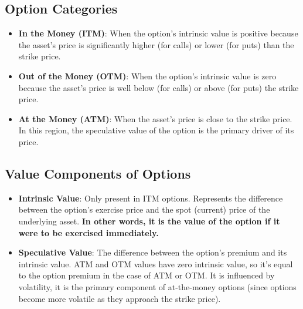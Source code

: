 \subsection*{Option Categories}

\begin{itemize}
    \item \textbf{In the Money (ITM)}: When the option's intrinsic value is positive because the asset's price is significantly higher (for calls) or lower (for puts) than the strike price. 
    \item \textbf{Out of the Money (OTM)}: When the option's intrinsic value is zero because the asset's price is well below (for calls) or above (for puts) the strike price.
    \item \textbf{At the Money (ATM)}: When the asset's price is close to the strike price. In this region, the speculative value of the option is the primary driver of its price.
\end{itemize}

\subsection*{Value Components of Options}

\begin{itemize}
    \item \textbf{Intrinsic Value}: Only present in ITM options. Represents the difference between the option's exercise price and the spot (current) price of the underlying asset. \textbf{In other words, it is the value of the option if it were to be exercised immediately.}
    \item \textbf{Speculative Value}: The difference between the option's premium and its intrinsic value. ATM and OTM values have zero intrinsic value, so it's equal to the option premium in the case of ATM or OTM. It is influenced by volatility, it is the primary component of at-the-money options (since options become more volatile as they approach the strike price).
\end{itemize}


